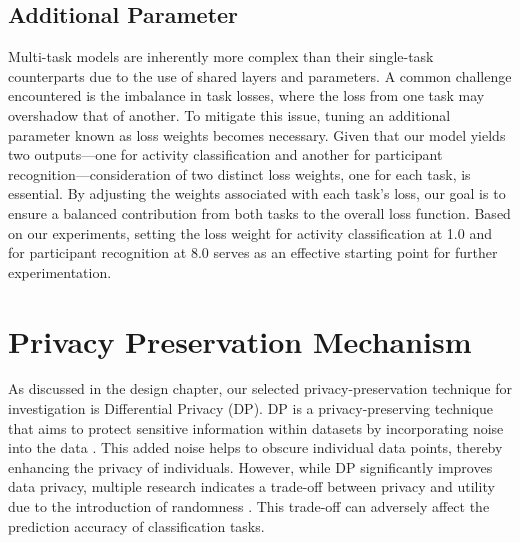\documentclass{l4proj}
\begin{document}
\subsection{Additional Parameter}
Multi-task models are inherently more complex than their single-task counterparts due to the use of shared layers and parameters. A common challenge encountered is the imbalance in task losses, where the loss from one task may overshadow that of another. To mitigate this issue, tuning an additional parameter known as loss weights becomes necessary. Given that our model yields two outputs—one for activity classification and another for participant recognition—consideration of two distinct loss weights, one for each task, is essential. By adjusting the weights associated with each task's loss, our goal is to ensure a balanced contribution from both tasks to the overall loss function. Based on our experiments, setting the loss weight for activity classification at 1.0 and for participant recognition at 8.0 serves as an effective starting point for further experimentation.

\section{Privacy Preservation Mechanism}
As discussed in the design chapter, our selected privacy-preservation technique for investigation is Differential Privacy (DP). DP is a privacy-preserving technique that aims to protect sensitive information within datasets by incorporating noise into the data \citep{differential_privacy}. This added noise helps to obscure individual data points, thereby enhancing the privacy of individuals. However, while DP significantly improves data privacy, multiple research indicates a trade-off between privacy and utility due to the introduction of randomness \citep{algorithmic_foundations_of_differential_privacy, limits_of_differential_privacy_and_its_misuse, tradeoff_between_dp_and_utility}. This trade-off can adversely affect the prediction accuracy of classification tasks.
\end{document}
